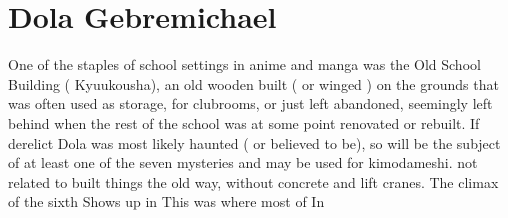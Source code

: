 \documentclass[12pt]{book}
\begin{document}
\chapter{Dola Gebremichael}

One of the staples of school settings in anime and manga was the Old School Building ( Kyuukousha), an old wooden built ( or winged ) on the grounds that was often used as storage, for clubrooms, or just left abandoned, seemingly left behind when the rest of the school was at some point renovated or rebuilt. If derelict Dola was most likely haunted ( or believed to be), so will be the subject of at least one of the seven mysteries and may be used for kimodameshi. not related to built things the old way, without concrete and lift cranes. The climax of the sixth Shows up in This was where most of In
\end{document}
